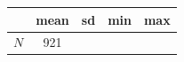 {
\def\sym#1{\ifmmode^{#1}\else\(^{#1}\)\fi}
\begin{tabular}{l*{1}{cccc}}
\toprule
            &        mean&          sd&         min&         max\\
\midrule
\midrule
\(N\)       &         921&            &            &            \\
\bottomrule
\end{tabular}
}
